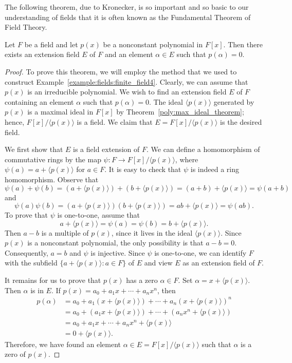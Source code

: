 The following theorem, due to Kronecker, is so important and so basic 
to our understanding of fields that it is often known as the
Fundamental Theorem of Field Theory.
 

\begin{theorem}\label{fields:ext_exist_theorem}
Let $F$ be a field and let $p(x)$ be a nonconstant polynomial in
$F[x]$.  Then there exists an extension field $E$ of $F$ and an 
element $\alpha \in E$ such that $p(\alpha) = 0$. 
\end{theorem}
 

\begin{proof}
To prove this theorem, we will employ the method that we used to
construct Example~\ref{example:fields:finite_field4}. Clearly, we can assume that $p(x)$ is an
irreducible polynomial. We wish to find an extension field $E$ of $F$
containing an element $\alpha$ such that $p(\alpha) = 0$. The ideal
$\langle p(x) \rangle$ generated by $p(x)$ is a maximal ideal in
$F[x]$ by Theorem~\ref{poly:max_ideal_theorem}; hence, $F[x]/\langle p(x) \rangle$ is a
field. We claim that $E = F[x]/\langle p(x) \rangle$ is the desired 
field.  


We first show that $E$ is a field extension of $F$. We can define a
homomorphism of commutative rings by the map
\mbox{$\psi:F \rightarrow F[x]/\langle p(x) \rangle$}, where $\psi(a) = a +
\langle p(x)\rangle$ for $a \in F$. It is easy to check that $\psi$ is
indeed a ring homomorphism.  Observe that 
\[
\psi( a ) + \psi( b ) = (a + \langle p(x) \rangle) + (b + \langle p(x)
\rangle) = (a + b) + \langle p(x) \rangle = \psi( a + b ) 
\]
and
\[
\psi( a )  \psi( b ) = (a  + \langle p(x) \rangle)  (b + \langle p(x)
\rangle) = a  b  + \langle p(x) \rangle = \psi( a  b ). 
\]
To prove that $\psi$ is one-to-one, assume that
\[
a + \langle p(x) \rangle = \psi(a) = \psi(b) = b + \langle p(x)
\rangle. 
\]
Then $a - b$ is a multiple of $p(x)$, since it lives in the
ideal $\langle p(x) \rangle$. Since $p(x)$ is a nonconstant
polynomial, the only possibility is that \mbox{$a - b = 0$}.
Consequently, $a = b$ and $\psi$ is injective. Since $\psi$ is
one-to-one, we can identify $F$ with the subfield $\{ a + \langle p(x)
\rangle : a \in F \}$ of $E$ and view $E$ as an extension field of $F$.
 

It remains for us to prove that $p(x)$ has a zero $\alpha \in F$. Set
$\alpha = x + \langle p(x) \rangle$. Then $\alpha$ is in $E$. If $p(x) =
a_0 + a_1 x + \cdots + a_n x^n$, then
\begin{align*}
p( \alpha )
& = 
a_0 + a_1( x + \langle p(x) \rangle) + \cdots + a_n ( x + \langle p(x)
\rangle)^n \\
& = 
a_0 + ( a_1 x + \langle p(x) \rangle) + \cdots + (a_n  x^n + \langle p(x)
\rangle) \\
& = 
a_0 + a_1 x + \cdots + a_n x^n + \langle p(x) \rangle \\
& = 
0 + \langle p(x) \rangle.
\end{align*}
Therefore, we have found an element $\alpha \in E = F[x]/\langle p(x)
\rangle$ such that $\alpha$ is a zero of $p(x)$.
\end{proof}
 


